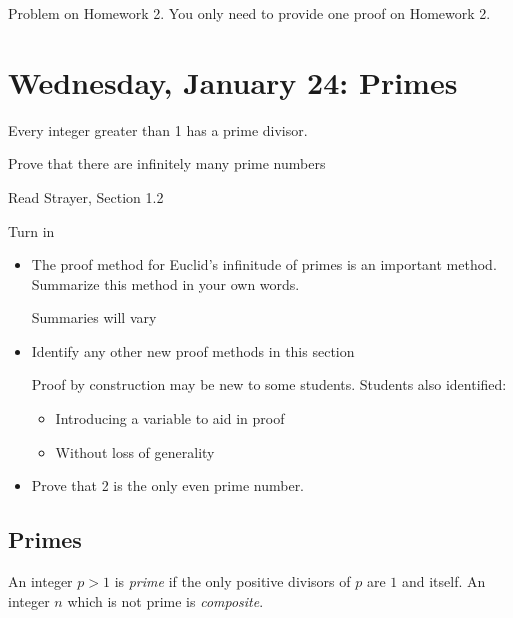 \documentclass{ximera}
\begin{document}
\begin{br} 
\begin{enumerate}
\end{enumerate}

\begin{solution}
 Problem on Homework 2. You only need to provide one proof on Homework 2.
\end{solution}
\end{br}
\section{Wednesday, January 24: Primes}

\begin{obj}
\item  Every integer greater than 1 has a prime divisor.
\item  Prove that there are infinitely many prime numbers
\end{obj}

\begin{pre}
 \item[Read] Strayer, Section 1.2
 \item[Turn in] 
\begin{itemize}
 \item The proof method for Euclid's infinitude of primes is an important method. Summarize this method in your own words.
 
\begin{solution}
 Summaries will vary
\end{solution}
 \item Identify any other new proof methods in this section
 
\begin{solution}
 Proof by construction may be new to some students. Students also identified: 
\begin{itemize}
 \item Introducing a variable to aid in proof
 \item Without loss of generality
 
\end{itemize}
\end{solution}
 \item Prove that 2 is the only even prime number.
 
\end{itemize}
\end{pre}


\subsection{Primes}
\begin{defn}
An integer $p>1$ is \emph{prime} if the only positive divisors of $p$ are $1$ and itself. An integer $n$ which is not prime is \emph{composite}. 
\end{defn}
\end{document}
